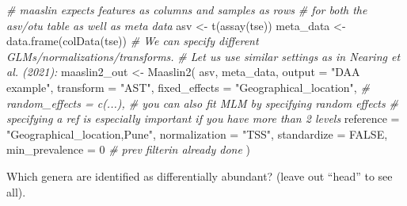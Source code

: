 \documentclass[
]{book}
\newenvironment{Shaded}{\begin{snugshade}}{\end{snugshade}}
\newcommand{\AttributeTok}[1]{\textcolor[rgb]{0.77,0.63,0.00}{#1}}
\newcommand{\CommentTok}[1]{\textcolor[rgb]{0.56,0.35,0.01}{\textit{#1}}}
\newcommand{\ConstantTok}[1]{\textcolor[rgb]{0.00,0.00,0.00}{#1}}
\newcommand{\DecValTok}[1]{\textcolor[rgb]{0.00,0.00,0.81}{#1}}
\newcommand{\FloatTok}[1]{\textcolor[rgb]{0.00,0.00,0.81}{#1}}
\newcommand{\FunctionTok}[1]{\textcolor[rgb]{0.00,0.00,0.00}{#1}}
\newcommand{\NormalTok}[1]{#1}
\newcommand{\OtherTok}[1]{\textcolor[rgb]{0.56,0.35,0.01}{#1}}
\newcommand{\SpecialCharTok}[1]{\textcolor[rgb]{0.00,0.00,0.00}{#1}}
\newcommand{\StringTok}[1]{\textcolor[rgb]{0.31,0.60,0.02}{#1}}
\begin{document}
\begin{Shaded}
\begin{Highlighting}[]
\CommentTok{\# maaslin expects features as columns and samples as rows }
\CommentTok{\# for both the asv/otu table as well as meta data }
\NormalTok{asv }\OtherTok{\textless{}{-}} \FunctionTok{t}\NormalTok{(}\FunctionTok{assay}\NormalTok{(tse))}
\NormalTok{meta\_data }\OtherTok{\textless{}{-}} \FunctionTok{data.frame}\NormalTok{(}\FunctionTok{colData}\NormalTok{(tse))}
\CommentTok{\# We can specify different GLMs/normalizations/transforms.}
\CommentTok{\# Let us use similar settings as in Nearing et al. (2021):}
\NormalTok{maaslin2\_out }\OtherTok{\textless{}{-}} \FunctionTok{Maaslin2}\NormalTok{(}
\NormalTok{  asv,}
\NormalTok{  meta\_data,}
  \AttributeTok{output =} \StringTok{"DAA example"}\NormalTok{,}
  \AttributeTok{transform =} \StringTok{"AST"}\NormalTok{,}
  \AttributeTok{fixed\_effects =} \StringTok{"Geographical\_location"}\NormalTok{,}
  \CommentTok{\# random\_effects = c(...), \# you can also fit MLM by specifying random effects}
  \CommentTok{\# specifying a ref is especially important if you have more than 2 levels}
  \AttributeTok{reference =} \StringTok{"Geographical\_location,Pune"}\NormalTok{,  }
  \AttributeTok{normalization =} \StringTok{"TSS"}\NormalTok{,}
  \AttributeTok{standardize =} \ConstantTok{FALSE}\NormalTok{,}
  \AttributeTok{min\_prevalence =} \DecValTok{0} \CommentTok{\# prev filterin already done}
\NormalTok{)}
\end{Highlighting}
\end{Shaded}

Which genera are identified as differentially abundant? (leave out ``head'' to see all).

\begin{Shaded}
\end{Shaded}
\end{document}
